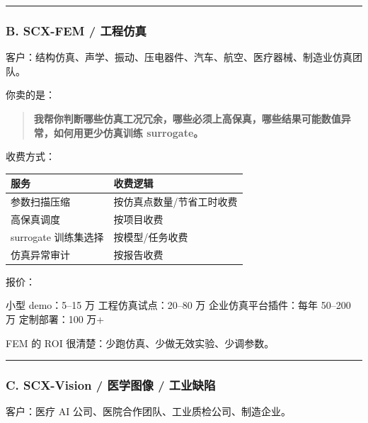 \documentclass[
  12pt,
]{ctexart}
\newenvironment{Shaded}{}{}
\newcommand{\NormalTok}[1]{#1}
\begin{document}
\begin{center}\rule{0.5\linewidth}{0.5pt}\end{center}

\subsubsection{B. SCX-FEM /
工程仿真}\label{b.-scx-fem-ux5de5ux7a0bux4effux771f}

客户：结构仿真、声学、振动、压电器件、汽车、航空、医疗器械、制造业仿真团队。

你卖的是：

\begin{quote}
\textbf{我帮你判断哪些仿真工况冗余，哪些必须上高保真，哪些结果可能数值异常，如何用更少仿真训练
surrogate。}
\end{quote}

收费方式：

\begin{longtable}[]{@{}ll@{}}
\toprule\noalign{}
服务 & 收费逻辑 \\
\midrule\noalign{}
\endhead
\bottomrule\noalign{}
\endlastfoot
参数扫描压缩 & 按仿真点数量/节省工时收费 \\
高保真调度 & 按项目收费 \\
surrogate 训练集选择 & 按模型/任务收费 \\
仿真异常审计 & 按报告收费 \\
\end{longtable}

报价：

\begin{Shaded}
\begin{Highlighting}[]
\NormalTok{小型 demo：5–15 万}
\NormalTok{工程仿真试点：20–80 万}
\NormalTok{企业仿真平台插件：每年 50–200 万}
\NormalTok{定制部署：100 万+}
\end{Highlighting}
\end{Shaded}

FEM 的 ROI 很清楚：少跑仿真、少做无效实验、少调参数。

\begin{center}\rule{0.5\linewidth}{0.5pt}\end{center}

\subsubsection{C. SCX-Vision / 医学图像 /
工业缺陷}\label{c.-scx-vision-ux533bux5b66ux56feux50cf-ux5de5ux4e1aux7f3aux9677}

客户：医疗 AI 公司、医院合作团队、工业质检公司、制造企业。
\end{document}
